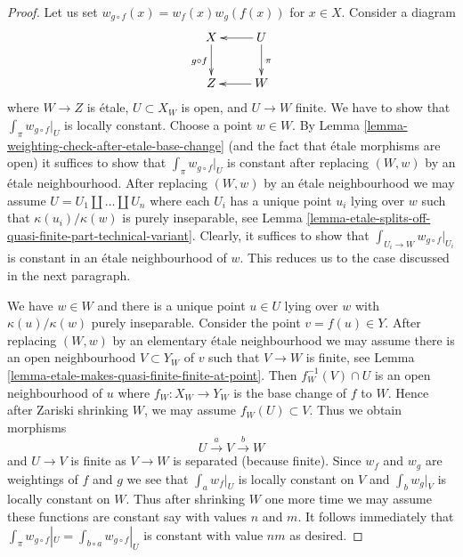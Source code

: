 \documentclass[10pt,a4paper]{amsart}
\theoremstyle{plain}
\theoremstyle{definition}
\theoremstyle{remark}
\numberwithin{equation}{subsection}
\begin{document}
\begin{proof}
Let us set $w_{g \circ f}(x) = w_f(x) w_g(f(x))$ for $x \in X$.
Consider a diagram
$$
\xymatrix{
X \ar[d]_{g \circ f} & U \ar[l] \ar[d]^\pi \\
Z & W \ar[l]
}
$$
where $W \to Z$ is \'etale, $U \subset X_W$ is open, and $U \to W$ finite.
We have to show that $\int_\pi w_{g \circ f}|_U$ is locally constant.
Choose a point $w \in W$. By
Lemma \ref{lemma-weighting-check-after-etale-base-change}
(and the fact that \'etale morphisms are open) it suffices to show that
$\int_\pi w_{g \circ f}|_U$ is constant after replacing
$(W, w)$ by an \'etale neighbourhood.
After replacing $(W, w)$ by an \'etale neighbourhood we may
assume $U = U_1 \amalg \ldots \amalg U_n$ where each $U_i$
has a unique point $u_i$ lying over $w$ such that
$\kappa(u_i)/\kappa(w)$ is purely inseparable, see
Lemma \ref{lemma-etale-splits-off-quasi-finite-part-technical-variant}.
Clearly, it suffices to show that $\int_{U_i \to W} w_{g \circ f}|_{U_i}$
is constant in an \'etale neighbourhood of $w$.
This reduces us to the case discussed in the next paragraph.

\medskip\noindent
We have $w \in W$ and there is a unique point $u \in U$ lying
over $w$ with $\kappa(u)/\kappa(w)$ purely inseparable.
Consider the point $v = f(u) \in Y$. After replacing
$(W, w)$ by an elementary \'etale neighbourhood we may
assume there is an open neighbourhood $V \subset Y_W$
of $v$ such that $V \to W$ is finite, see
Lemma \ref{lemma-etale-makes-quasi-finite-finite-at-point}.
Then $f_W^{-1}(V) \cap U$ is an open neighbourhood of $u$
where $f_W : X_W \to Y_W$ is the base change of $f$ to $W$.
Hence after Zariski shrinking $W$, we may assume $f_W(U) \subset V$.
Thus we obtain morphisms
$$
U \xrightarrow{a} V \xrightarrow{b} W
$$
and $U \to V$ is finite as $V \to W$ is separated (because finite).
Since $w_f$ and $w_g$ are weightings of $f$ and $g$
we see that $\int_a w_f|_U$ is locally constant on $V$ and
$\int_b w_g|_V$ is locally constant on $W$. Thus after shrinking
$W$ one more time we may assume these functions are constant
say with values $n$ and $m$. It follows immediately that
$\int_\pi w_{g \circ f}|_U = \int_{b \circ a} w_{g \circ f}|_U$
is constant with value $nm$ as desired.
\end{proof}
\end{document}

